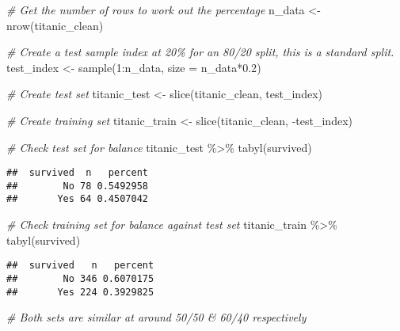 \documentclass[
]{article}
\newenvironment{Shaded}{\begin{snugshade}}{\end{snugshade}}
\newcommand{\AttributeTok}[1]{\textcolor[rgb]{0.77,0.63,0.00}{#1}}
\newcommand{\CommentTok}[1]{\textcolor[rgb]{0.56,0.35,0.01}{\textit{#1}}}
\newcommand{\DecValTok}[1]{\textcolor[rgb]{0.00,0.00,0.81}{#1}}
\newcommand{\FloatTok}[1]{\textcolor[rgb]{0.00,0.00,0.81}{#1}}
\newcommand{\FunctionTok}[1]{\textcolor[rgb]{0.00,0.00,0.00}{#1}}
\newcommand{\NormalTok}[1]{#1}
\newcommand{\OtherTok}[1]{\textcolor[rgb]{0.56,0.35,0.01}{#1}}
\newcommand{\SpecialCharTok}[1]{\textcolor[rgb]{0.00,0.00,0.00}{#1}}
\begin{document}
\begin{Shaded}
\begin{Highlighting}[]
\CommentTok{\# Get the number of rows to work out the percentage}
\NormalTok{n\_data }\OtherTok{\textless{}{-}} \FunctionTok{nrow}\NormalTok{(titanic\_clean)}

\CommentTok{\# Create a test sample index at 20\% for an 80/20 split, this is a standard split.}
\NormalTok{test\_index }\OtherTok{\textless{}{-}} \FunctionTok{sample}\NormalTok{(}\DecValTok{1}\SpecialCharTok{:}\NormalTok{n\_data, }\AttributeTok{size =}\NormalTok{ n\_data}\SpecialCharTok{*}\FloatTok{0.2}\NormalTok{)}

\CommentTok{\# Create test set}
\NormalTok{titanic\_test  }\OtherTok{\textless{}{-}} \FunctionTok{slice}\NormalTok{(titanic\_clean, test\_index)}

\CommentTok{\# Create training set}
\NormalTok{titanic\_train }\OtherTok{\textless{}{-}} \FunctionTok{slice}\NormalTok{(titanic\_clean, }\SpecialCharTok{{-}}\NormalTok{test\_index)}
\end{Highlighting}
\end{Shaded}

\begin{Shaded}
\begin{Highlighting}[]
\CommentTok{\# Check test set for balance}
\NormalTok{titanic\_test }\SpecialCharTok{\%\textgreater{}\%}
 \FunctionTok{tabyl}\NormalTok{(survived)}
\end{Highlighting}
\end{Shaded}

\begin{verbatim}
##  survived  n   percent
##        No 78 0.5492958
##       Yes 64 0.4507042
\end{verbatim}

\begin{Shaded}
\begin{Highlighting}[]
\CommentTok{\# Check training set for balance against test set}
\NormalTok{titanic\_train }\SpecialCharTok{\%\textgreater{}\%} 
  \FunctionTok{tabyl}\NormalTok{(survived)}
\end{Highlighting}
\end{Shaded}

\begin{verbatim}
##  survived   n   percent
##        No 346 0.6070175
##       Yes 224 0.3929825
\end{verbatim}

\begin{Shaded}
\begin{Highlighting}[]
\CommentTok{\# Both sets are similar at around 50/50 \& 60/40 respectively}
\end{Highlighting}
\end{Shaded}
\end{document}
